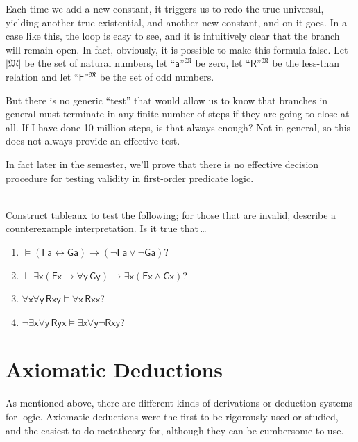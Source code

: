 \documentclass[12pt]{report}
\theoremstyle{nonumberplain}
\newcounter{hwex}
\newenvironment{hw}{\refstepcounter{hwex}\bigskip\noindent\fbox{\textsc{~Homework~\arabic{hwex}~}}\\[0.2\baselineskip]
\noindent}{}
\newcommand{\M}{\mathfrak{M}}
\renewcommand{\o}[1]{\mathsf{#1}}
\begin{document}
\noindent Each time we add a new constant, it triggers us to redo the true universal, yielding another true existential, and another new constant, and on it goes. In a case like this, the loop is easy to see, and it is intuitively clear that the branch will remain open. In fact, obviously, it is possible to make this formula false. Let $|\M|$ be the set of natural numbers, let ``$\o{a}$''$^\M$ be zero, let ``$\o{R}$''$^\M$ be the less-than relation and let ``$\o{F}$''$^\M$ be the set of odd numbers.


But there is no generic ``test'' that would allow us to know that branches in general must terminate in any finite number of steps if they are going to close at all. If I have done 10 million steps, is that always enough? Not in general, so this does not always provide an effective test.

In fact later in the semester, we'll prove that there is no effective decision procedure for testing validity in first-order predicate logic.

\begin{hw}
Construct tableaux to test the following; for those that are invalid, describe a counterexample interpretation. Is it true that\,\ldots
\begin{enumerate}
\item $⊨ (\o{Fa} ↔ \o{Ga}) → (¬\o{Fa} ∨ ¬\o{Ga})$?
\item $⊨ ∃\o{x}(\o{Fx} → ∀\o{y\,Gy}) → ∃\o{x}(\o{Fx} ∧ \o{Gx})$?
\item $∀\o{x}∀\o{y\,Rxy} ⊨ ∀\o{x\,Rxx}$?
\item $¬∃\o{x}∀\o{y\,Ryx} ⊨ ∃\o{x}∀\o{y}¬\o{Rxy}$?
\end{enumerate}
\end{hw}

\section{Axiomatic Deductions}

As mentioned above, there are different kinds of derivations or deduction systems for logic. Axiomatic deductions were the first to be rigorously used or studied, and the easiest to do metatheory for, although they can be cumbersome to use.
\end{document}
